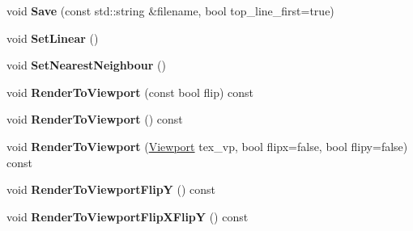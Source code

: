 \begin{DoxyCompactItemize}
\item 
void {\bfseries Save} (const std\+::string \&filename, bool top\+\_\+line\+\_\+first=true)\hypertarget{classpangolin_1_1_gl_texture_ae8b002a221eefa9871e8a8233f34ddc1}{}\label{classpangolin_1_1_gl_texture_ae8b002a221eefa9871e8a8233f34ddc1}

\item 
void {\bfseries Set\+Linear} ()\hypertarget{classpangolin_1_1_gl_texture_aab0a12025f129a4bd4ce8e7fe732d727}{}\label{classpangolin_1_1_gl_texture_aab0a12025f129a4bd4ce8e7fe732d727}

\item 
void {\bfseries Set\+Nearest\+Neighbour} ()\hypertarget{classpangolin_1_1_gl_texture_aa30d98009f39b9e6946134505fa4b87d}{}\label{classpangolin_1_1_gl_texture_aa30d98009f39b9e6946134505fa4b87d}

\item 
void {\bfseries Render\+To\+Viewport} (const bool flip) const \hypertarget{classpangolin_1_1_gl_texture_a91a8d237faf8dc021dcd2190b1f57837}{}\label{classpangolin_1_1_gl_texture_a91a8d237faf8dc021dcd2190b1f57837}

\item 
void {\bfseries Render\+To\+Viewport} () const \hypertarget{classpangolin_1_1_gl_texture_a4ab143bc3dcbaa056ee674fb121751ea}{}\label{classpangolin_1_1_gl_texture_a4ab143bc3dcbaa056ee674fb121751ea}

\item 
void {\bfseries Render\+To\+Viewport} (\hyperlink{structpangolin_1_1_viewport}{Viewport} tex\+\_\+vp, bool flipx=false, bool flipy=false) const \hypertarget{classpangolin_1_1_gl_texture_a53afa64af3be9b786aa58ce737d20833}{}\label{classpangolin_1_1_gl_texture_a53afa64af3be9b786aa58ce737d20833}

\item 
void {\bfseries Render\+To\+Viewport\+FlipY} () const \hypertarget{classpangolin_1_1_gl_texture_a308da3c55bb8bb6dc36c780be9e6c718}{}\label{classpangolin_1_1_gl_texture_a308da3c55bb8bb6dc36c780be9e6c718}

\item 
void {\bfseries Render\+To\+Viewport\+Flip\+X\+FlipY} () const \hypertarget{classpangolin_1_1_gl_texture_ab4a06f047c643210ac058abbcc0b8481}{}\label{classpangolin_1_1_gl_texture_ab4a06f047c643210ac058abbcc0b8481}

\end{DoxyCompactItemize}

